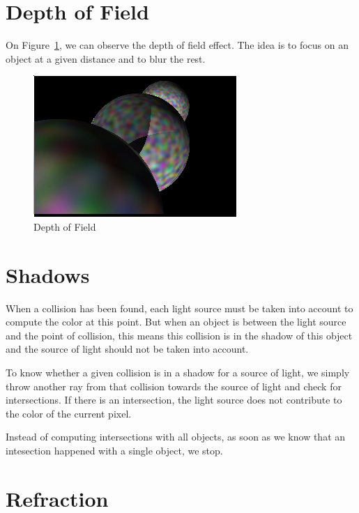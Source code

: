 \documentclass[a4paper,12pt,journal,twoside,compsoc]{PPIEEEtran}
\begin{document}
\section{Depth of Field}

On Figure~\ref{fig:dof}, we can observe the depth of field effect. The idea
is to focus on an object at a given distance and to blur the rest.

\begin{figure}
  \begin{center}
    \includegraphics[width=0.7\linewidth]{dof.png}
  \end{center}
  \caption{Depth of Field}
  \label{fig:dof}
\end{figure}

\section{Shadows}
When a collision has been found, each light source must be taken into account to
compute the color at this point.  But when an object is between the light source
and the point of collision, this means this collision is in the shadow of this
object and the source of light should not be taken into account.

To know whether a given collision is in a shadow for a source of light, we
simply throw another ray from that collision towards the source of light and
check for intersections.  If there is an intersection, the light source does not
contribute to the color of the current pixel.

\indent Instead of computing intersections with all objects, as soon as we
know that an intesection happened with a single object, we stop.

\section{Refraction}
\end{document}
